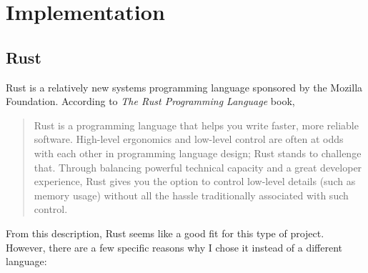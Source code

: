 \section{Implementation} \label{implementation}

\subsection{Rust}

Rust is a relatively new systems programming language\cite{rust_website} sponsored by the Mozilla Foundation. According to \emph{The Rust Programming Language} book\cite{trpl},

\begin{quote}
Rust is a programming language that helps you write faster, more reliable software. High-level ergonomics and low-level control are often at odds with each other in programming language design; Rust stands to challenge that. Through balancing powerful technical capacity and a great developer experience, Rust gives you the option to control low-level details (such as memory usage) without all the hassle traditionally associated with such control.
\end{quote}

From this description, Rust seems like a good fit for this type of project. However, there are a few specific reasons why I chose it instead of a different language:

